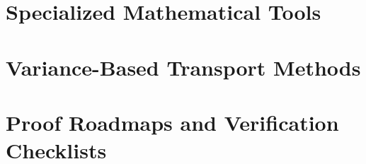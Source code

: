 \documentclass[11pt,a4paper]{report}
\begin{document}
\chapter{Specialized Mathematical Tools}
\label{ch:novel-tools}







\chapter{Variance-Based Transport Methods}
\label{ch:variance}


\chapter{Proof Roadmaps and Verification Checklists}
\label{ch:roadmaps}














\end{document}
